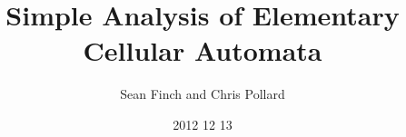 \documentclass{article}
\author{Sean Finch and Chris Pollard}
\date{2012 12 13}
\title{Simple Analysis of Elementary Cellular Automata}
\begin{document}
\maketitle

\vspace{3in}

\begin{abstract}
\end{abstract}

\newpage






\end{document}
